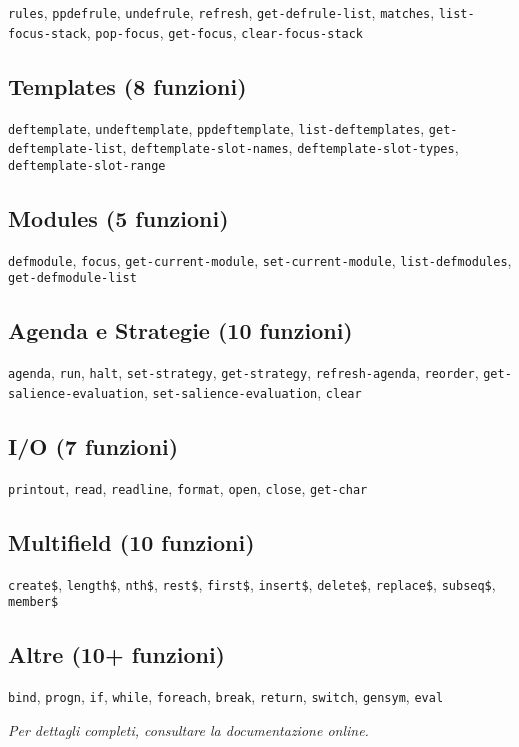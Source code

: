 \texttt{rules}, \texttt{ppdefrule}, \texttt{undefrule}, \texttt{refresh}, \texttt{get-defrule-list}, \texttt{matches}, \texttt{list-focus-stack}, \texttt{pop-focus}, \texttt{get-focus}, \texttt{clear-focus-stack}

\subsection{Templates (8 funzioni)}

\texttt{deftemplate}, \texttt{undeftemplate}, \texttt{ppdeftemplate}, \texttt{list-deftemplates}, \texttt{get-deftemplate-list}, \texttt{deftemplate-slot-names}, \texttt{deftemplate-slot-types}, \texttt{deftemplate-slot-range}

\subsection{Modules (5 funzioni)}

\texttt{defmodule}, \texttt{focus}, \texttt{get-current-module}, \texttt{set-current-module}, \texttt{list-defmodules}, \texttt{get-defmodule-list}

\subsection{Agenda e Strategie (10 funzioni)}

\texttt{agenda}, \texttt{run}, \texttt{halt}, \texttt{set-strategy}, \texttt{get-strategy}, \texttt{refresh-agenda}, \texttt{reorder}, \texttt{get-salience-evaluation}, \texttt{set-salience-evaluation}, \texttt{clear}

\subsection{I/O (7 funzioni)}

\texttt{printout}, \texttt{read}, \texttt{readline}, \texttt{format}, \texttt{open}, \texttt{close}, \texttt{get-char}

\subsection{Multifield (10 funzioni)}

\texttt{create\$}, \texttt{length\$}, \texttt{nth\$}, \texttt{rest\$}, \texttt{first\$}, \texttt{insert\$}, \texttt{delete\$}, \texttt{replace\$}, \texttt{subseq\$}, \texttt{member\$}

\subsection{Altre (10+ funzioni)}

\texttt{bind}, \texttt{progn}, \texttt{if}, \texttt{while}, \texttt{foreach}, \texttt{break}, \texttt{return}, \texttt{switch}, \texttt{gensym}, \texttt{eval}

\textit{Per dettagli completi, consultare la documentazione online.}

